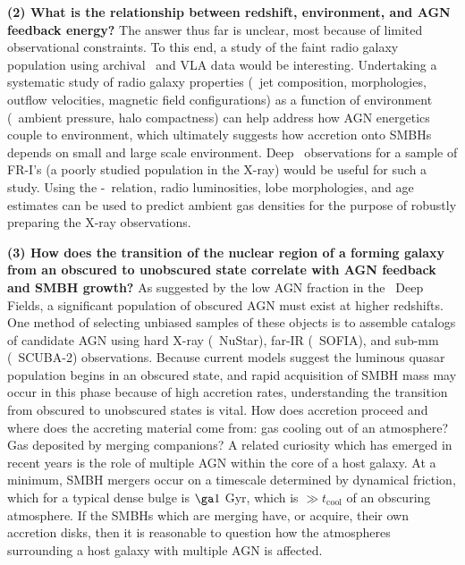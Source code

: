 \documentclass[11pt]{article}
\begin{document}
{\bf{(2) What is the relationship between redshift, environment, and
AGN feedback energy?}} The answer thus far is unclear, most because of
limited observational constraints. To this end, a study of the faint
radio galaxy population using archival \chandra\ and VLA data would be
interesting. Undertaking a systematic study of radio galaxy properties
(\ie\ jet composition, morphologies, outflow velocities, magnetic
field configurations) as a function of environment (\ie\ ambient
pressure, halo compactness) can help address how AGN energetics couple
to environment, which ultimately suggests how accretion onto SMBHs
depends on small and large scale environment. Deep \chandra\
observations for a sample of FR-I's (a poorly studied population in
the X-ray) would be useful for such a study. Using the
\pjet-\lrad\ relation, radio luminosities, lobe morphologies, and age
estimates can be used to predict ambient gas densities for the purpose
of robustly preparing the X-ray observations.

{\bf{(3) How does the transition of the nuclear region of a forming
galaxy from an obscured to unobscured state correlate with AGN
feedback and SMBH growth?}} As suggested by the low AGN fraction in
the \chandra\ Deep Fields, a significant population of obscured AGN
must exist at higher redshifts. One method of selecting unbiased
samples of these objects is to assemble catalogs of candidate AGN
using hard X-ray (\ie\ NuStar), far-IR (\ie\ SOFIA), and sub-mm (\ie\
SCUBA-2) observations. Because current models suggest the luminous
quasar population begins in an obscured state, and rapid acquisition
of SMBH mass may occur in this phase because of high accretion rates,
understanding the transition from obscured to unobscured states is
vital. How does accretion proceed and where does the accreting
material come from: gas cooling out of an atmosphere? Gas deposited by
merging companions? A related curiosity which has emerged in recent
years is the role of multiple AGN within the core of a host galaxy. At
a minimum, SMBH mergers occur on a timescale determined by dynamical
friction, which for a typical dense bulge is $\ga 1$ Gyr, which is
$\gg t_{\mathrm{cool}}$ of an obscuring atmosphere. If the SMBHs which
are merging have, or acquire, their own accretion disks, then it is
reasonable to question how the atmospheres surrounding a host galaxy
with multiple AGN is affected.

\scriptsize


 
\end{document}
